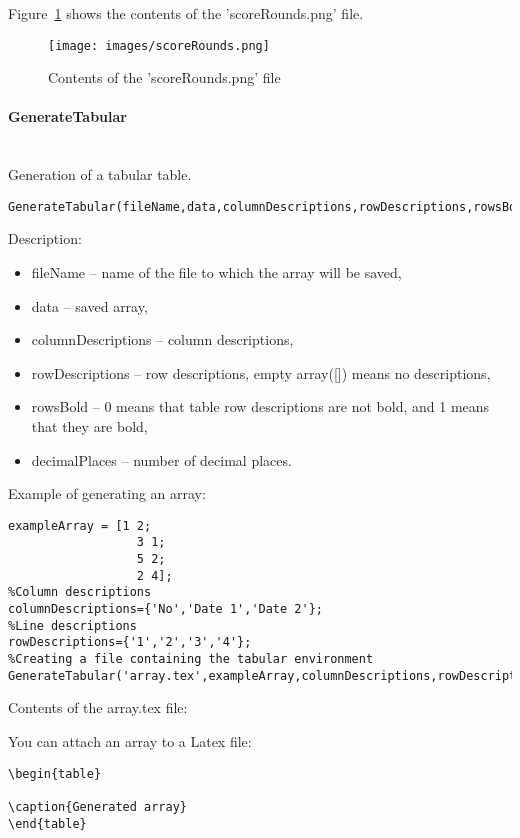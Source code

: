 Figure~\ref{Fig:scoreRounds} shows the contents of the 'scoreRounds.png' file.

\begin{figure}
\texttt{[image: images/scoreRounds.png]}
\caption{Contents of the 'scoreRounds.png' file}
\label{Fig:scoreRounds}
\end{figure} 

\paragraph{GenerateTabular} \hspace{0pt} \\
Generation of a tabular table.
\begin{lstlisting}[style=Matlab-editor]
GenerateTabular(fileName,data,columnDescriptions,rowDescriptions,rowsBold,decimalPlaces)
\end{lstlisting}

Description:
\begin{itemize}
\item fileName -- name of the file to which the array will be saved,
\item data -- saved array,
\item columnDescriptions -- column descriptions,
\item rowDescriptions -- row descriptions, empty array([]) means no descriptions,
\item rowsBold -- 0 means that table row descriptions are not bold, and 1 means that they are bold,
\item decimalPlaces -- number of decimal places.
\end{itemize}

Example of generating an array:
\begin{lstlisting}[style=Matlab-editor]
%Array
exampleArray = [1 2;
                  3 1;
                  5 2;
                  2 4];
%Column descriptions
columnDescriptions={'No','Date 1','Date 2'};
%Line descriptions
rowDescriptions={'1','2','3','4'};
%Creating a file containing the tabular environment
GenerateTabular('array.tex',exampleArray,columnDescriptions,rowDescriptions,0,0);
\end{lstlisting}

Contents of the array.tex file:


You can attach an array to a Latex file:
\begin{lstlisting}[style=lstStyleLaTeX]
\begin{table}

\caption{Generated array}
\end{table}
\end{lstlisting}

